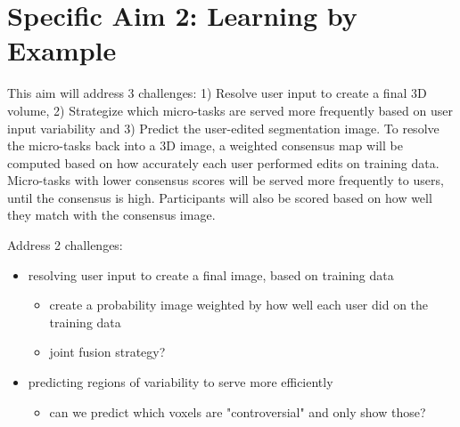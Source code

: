 
\section{Specific Aim 2: Learning by Example}
This aim will address 3 challenges: 1) Resolve user input to create a final 3D volume, 2) Strategize which micro-tasks are served more frequently based on user input variability and 3) Predict the user-edited segmentation image. To resolve the micro-tasks back into a 3D image, a weighted consensus map will be computed based on how accurately each user performed edits on training data. Micro-tasks with lower consensus scores will be served more frequently to users, until the consensus is high. Participants will also be scored based on how well they match with the consensus image. 


Address 2 challenges:
\begin{itemize}
\item resolving user input to create a final image, based on training data
\begin{itemize}
\item create a probability image weighted by how well each user did on the training data
\item joint fusion strategy?
\end{itemize}
\item predicting regions of variability to serve more efficiently
\begin{itemize}
\item can we predict which voxels are "controversial" and only show those?
\end{itemize}
\end{itemize}
